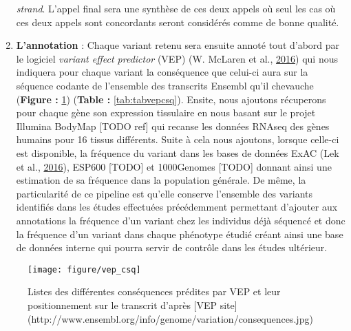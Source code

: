 \documentclass[12pt,twoside]{reedthesis}
\theoremstyle{definition}
\theoremstyle{definition}
\theoremstyle{remark}
\begin{document}
\begin{enumerate}
    \emph{strand}. L'appel final sera une synthèse de ces deux appels où
    seul les cas où ces deux appels sont concordants seront considérés
    comme de bonne qualité.\\
  \item
    \textbf{L'annotation} : Chaque variant retenu sera ensuite annoté tout
    d'abord par le logiciel \emph{variant effect predictor} (VEP) (W.
    McLaren et al., \protect\hyperlink{ref-McLaren2016}{2016}) qui nous
    indiquera pour chaque variant la conséquence que celui-ci aura sur la
    séquence codante de l'ensemble des transcrits Ensembl qu'il chevauche
    (\textbf{Figure : }\ref{fig:figvepcsq}) (\textbf{Table :
    }\ref{tab:tabvepcsq}). Ensite, nous ajoutons récuperons pour chaque
    gène son expression tissulaire en nous basant sur le projet Illumina
    BodyMap {[}TODO ref{]} qui recanse les données RNAseq des gènes
    humains pour 16 tissus différents. Suite à cela nous ajoutons, lorsque
    celle-ci est disponible, la fréquence du variant dans les bases de
    données ExAC (Lek et al., \protect\hyperlink{ref-Lek2016}{2016}),
    ESP600 {[}TODO{]} et 1000Genomes {[}TODO{]} donnant ainsi une
    estimation de sa fréquence dans la population générale. De même, la
    particularité de ce pipeline est qu'elle conserve l'ensemble des
    variants identifiés dans les études effectuées précédemment permettant
    d'ajouter aux annotations la fréquence d'un variant chez les individus
    déjà séquencé et donc la fréquence d'un variant dans chaque phénotype
    étudié créant ainsi une base de données interne qui pourra servir de
    contrôle dans les études ultérieur.
  \end{enumerate}
  
  \begin{figure}
  
  {\centering \texttt{[image: figure/vep\_csq]} 
  
  }
  
  \caption[Listes des différentes conséquences prédites par VEP et leur positionnement sur le transcrit]{Listes des différentes conséquences prédites par VEP et leur positionnement sur le transcrit d'après [VEP site](http://www.ensembl.org/info/genome/variation/consequences.jpg)}\label{fig:figvepcsq}
  \end{figure}
  
\end{document}
